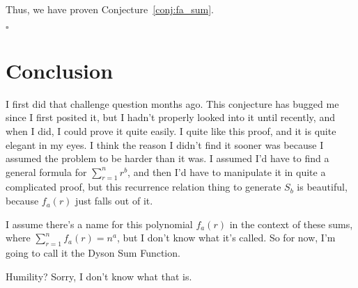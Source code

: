 \documentclass[a4paper]{article}
\newcommand{\sn}{\sum\limits_{r=1}^{n}}
\begin{document}
Thus, we have proven Conjecture~\ref{conj:fa_sum}.

\hspace*{\fill}$\square$

\section{Conclusion}

I first did that challenge question months ago. This conjecture has bugged me since I first posited it, but I hadn't properly looked into it until recently, and when I did, I could prove it quite easily. I quite like this proof, and it is quite elegant in my eyes. I think the reason I didn't find it sooner was because I assumed the problem to be harder than it was. I assumed I'd have to find a general formula for $\sn r^b$, and then I'd have to manipulate it in quite a complicated proof, but this recurrence relation thing to generate $S_b$ is beautiful, because $f_a(r)$ just falls out of it.

I assume there's a name for this polynomial $f_a(r)$ in the context of these sums, where $\sn f_a(r) = n^a$, but I don't know what it's called. So for now, I'm going to call it the Dyson Sum Function.

Humility? Sorry, I don't know what that is.

\printbibliography
\end{document}
